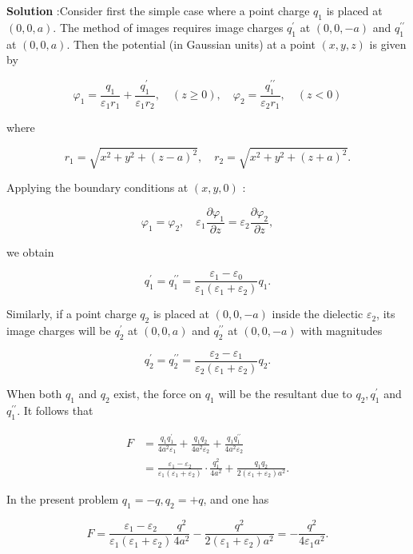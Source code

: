 \documentclass[10pt]{article}
\begin{document}
\textbf{Solution} :Consider first the simple case where a point charge $q_{1}$ is placed at $(0,0, a)$. The method of images requires image charges $q_{1}^{\prime}$ at $(0,0,-a)$ and $q_{1}^{\prime \prime}$ at $(0,0, a)$. Then the potential (in Gaussian units) at a point $(x, y, z)$ is given by

$$
\varphi_{1}=\frac{q_{1}}{\varepsilon_{1} r_{1}}+\frac{q_{1}^{\prime}}{\varepsilon_{1} r_{2}}, \quad(z \geq 0), \quad \varphi_{2}=\frac{q_{1}^{\prime \prime}}{\varepsilon_{2} r_{1}}, \quad(z<0)
$$

where

$$
r_{1}=\sqrt{x^{2}+y^{2}+(z-a)^{2}}, \quad r_{2}=\sqrt{x^{2}+y^{2}+(z+a)^{2}} .
$$

Applying the boundary conditions at $(x, y, 0)$ :

$$
\varphi_{1}=\varphi_{2}, \quad \varepsilon_{1} \frac{\partial \varphi_{1}}{\partial z}=\varepsilon_{2} \frac{\partial \varphi_{2}}{\partial z},
$$

we obtain

$$
q_{1}^{\prime}=q_{1}^{\prime \prime}=\frac{\varepsilon_{1}-\varepsilon_{0}}{\varepsilon_{1}\left(\varepsilon_{1}+\varepsilon_{2}\right)} q_{1} .
$$

Similarly, if a point charge $q_{2}$ is placed at $(0,0,-a)$ inside the dielectic $\varepsilon_{2}$, its image charges will be $q_{2}^{\prime}$ at $(0,0, a)$ and $q_{2}^{\prime \prime}$ at $(0,0,-a)$ with magnitudes

$$
q_{2}^{\prime}=q_{2}^{\prime \prime}=\frac{\varepsilon_{2}-\varepsilon_{1}}{\varepsilon_{2}\left(\varepsilon_{1}+\varepsilon_{2}\right)} q_{2} .
$$

When both $q_{1}$ and $q_{2}$ exist, the force on $q_{1}$ will be the resultant due to $q_{2}, q_{1}^{\prime}$ and $q_{1}^{\prime \prime}$. It follows that

$$
\begin{aligned}
F &=\frac{q_{1} q_{1}^{\prime}}{4 a^{2} \varepsilon_{1}}+\frac{q_{1} q_{2}}{4 a^{2} \varepsilon_{2}}+\frac{q_{1} q_{1}^{\prime \prime}}{4 a^{2} \varepsilon_{2}} \\
&=\frac{\varepsilon_{1}-\varepsilon_{2}}{\varepsilon_{1}\left(\varepsilon_{1}+\varepsilon_{2}\right)} \cdot \frac{q_{1}^{2}}{4 a^{2}}+\frac{q_{1} q_{2}}{2\left(\varepsilon_{1}+\varepsilon_{2}\right) a^{2}} .
\end{aligned}
$$

In the present problem $q_{1}=-q, q_{2}=+q$, and one has

$$
F=\frac{\varepsilon_{1}-\varepsilon_{2}}{\varepsilon_{1}\left(\varepsilon_{1}+\varepsilon_{2}\right)} \frac{q^{2}}{4 a^{2}}-\frac{q^{2}}{2\left(\varepsilon_{1}+\varepsilon_{2}\right) a^{2}}=-\frac{q^{2}}{4 \varepsilon_{1} a^{2}} .
$$
\end{document}
